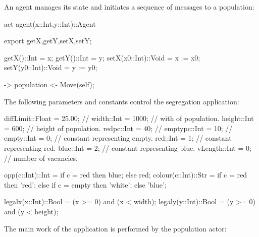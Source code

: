\documentclass[5p,times]{elsarticle}
\begin{document}
An agent manages its state and initiates a sequence of messages to a population:
\begin{ESL}
act agent(x::Int,y::Int)::Agent {

  export getX,getY,setX,setY;

  getX()::Int = x;
  getY()::Int = y;
  setX(x0::Int)::Void = x := x0;
  setY(y0::Int)::Void = y := y0;

  -> population <- Move(self);
  
}
\end{ESL}
The following parameters and constants control the segregation application:
\begin{ESL}
diffLimit::Float = 25.00;  // %
width::Int       = 1000;   // with of population.
height::Int      = 600;    // height of population.
redpc::Int       = 40;     // %
emptypc::Int     = 10;     // %
empty::Int       = 0;      // constant representing empty.
red::Int         = 1;      // constant representing red.
blue::Int        = 2;      // constant representing blue.
vLength::Int     = 0;      // number of vacancies.

opp(c::Int)::Int = if c = red then blue; else red;
colour(c::Int)::Str = 
  if c = red then 'red'; 
  else if c = empty then 'white'; 
  else 'blue';

legalx(x::Int)::Bool = (x >= 0) and (x < width);
legaly(y::Int)::Bool = (y >= 0) and (y < height);
\end{ESL}
The main work of the application is performed by the population actor:
\end{document}
